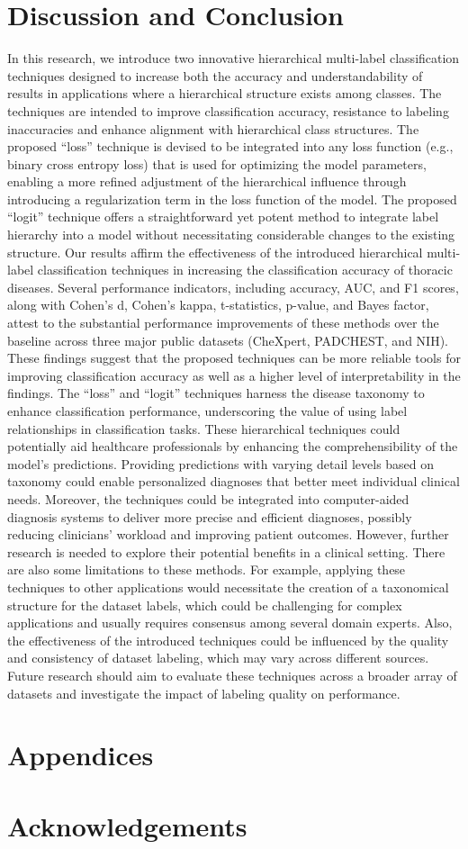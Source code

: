 \section{Discussion and Conclusion}\label{sec:taxonomy.discussion}
%
In this research, we introduce two innovative hierarchical multi-label classification techniques designed to increase both the accuracy and understandability of results in applications where a hierarchical structure exists among classes. The techniques are intended to improve classification accuracy, resistance to labeling inaccuracies and enhance alignment with hierarchical class structures. The proposed ``loss'' technique is devised to be integrated into any loss function (e.g., binary cross entropy loss) that is used for optimizing the model parameters, enabling a more refined adjustment of the hierarchical influence through introducing a regularization term in the loss function of the model. The proposed ``logit'' technique offers a straightforward yet potent method to integrate label hierarchy into a model without necessitating considerable changes to the existing structure.
%
Our results affirm the effectiveness of the introduced hierarchical multi-label classification techniques in increasing the classification accuracy of thoracic diseases. Several performance indicators, including accuracy, AUC, and F1 scores, along with Cohen's d, Cohen's kappa, t-statistics, p-value, and Bayes factor, attest to the substantial performance improvements of these methods over the baseline across three major public datasets (CheXpert, PADCHEST, and NIH). These findings suggest that the proposed techniques can be more reliable tools for improving classification accuracy as well as a higher level of interpretability in the findings.
%
The ``loss'' and ``logit'' techniques harness the disease taxonomy to enhance classification performance, underscoring the value of using label relationships in classification tasks. These hierarchical techniques could potentially aid healthcare professionals by enhancing the comprehensibility of the model's predictions. Providing predictions with varying detail levels based on taxonomy could enable personalized diagnoses that better meet individual clinical needs. Moreover, the techniques could be integrated into computer-aided diagnosis systems to deliver more precise and efficient diagnoses, possibly reducing clinicians' workload and improving patient outcomes.
%
However, further research is needed to explore their potential benefits in a clinical setting. There are also some limitations to these methods. For example, applying these techniques to other applications would necessitate the creation of a taxonomical structure for the dataset labels, which could be challenging for complex applications and usually requires consensus among several domain experts. Also, the effectiveness of the introduced techniques could be influenced by the quality and consistency of dataset labeling, which may vary across different sources. Future research should aim to evaluate these techniques across a broader array of datasets and investigate the impact of labeling quality on performance.
%
\section*{Appendices}

\section*{Acknowledgements}


